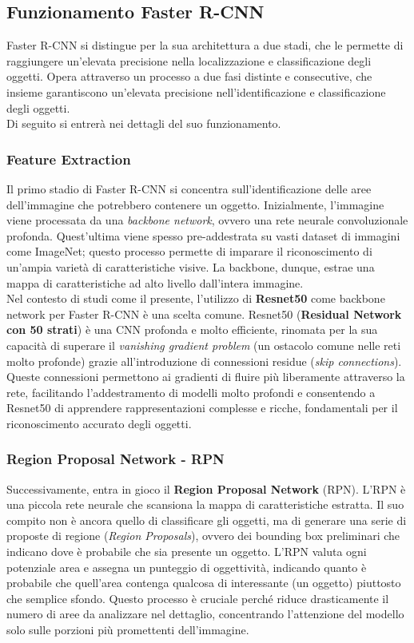 \documentclass[12pt]{article}
\begin{document}
\subsection{Funzionamento Faster R-CNN}
Faster R-CNN si distingue per la sua architettura a due stadi, che le permette di raggiungere un'elevata precisione nella localizzazione e classificazione degli oggetti. Opera attraverso un processo a due fasi distinte e consecutive, che insieme garantiscono un'elevata precisione nell'identificazione e classificazione degli oggetti. \\
Di seguito si entrerà nei dettagli del suo funzionamento.

\subsubsection{Feature Extraction}
Il primo stadio di Faster R-CNN si concentra sull'identificazione delle aree dell'immagine che potrebbero contenere un oggetto. Inizialmente, l'immagine viene processata da una \textit{backbone network}, ovvero una rete neurale convoluzionale profonda. Quest'ultima viene spesso pre-addestrata su vasti dataset di immagini come ImageNet; questo processo permette di imparare il riconoscimento di un'ampia varietà di caratteristiche visive. La backbone, dunque, estrae una mappa di caratteristiche ad alto livello dall'intera immagine. \\
Nel contesto di studi come il presente, l'utilizzo di \textbf{Resnet50} come backbone network per Faster R-CNN è una scelta comune. Resnet50 (\textbf{Residual Network con 50 strati}) è una CNN profonda e molto efficiente, rinomata per la sua capacità di superare il \textit{vanishing gradient problem} (un ostacolo comune nelle reti molto profonde) grazie all'introduzione di connessioni residue (\textit{skip connections}). Queste connessioni permettono ai gradienti di fluire più liberamente attraverso la rete, facilitando l'addestramento di modelli molto profondi e consentendo a Resnet50 di apprendere rappresentazioni complesse e ricche, fondamentali per il riconoscimento accurato degli oggetti.

\subsubsection{Region Proposal Network - RPN}
Successivamente, entra in gioco il \textbf{Region Proposal Network} (RPN). L'RPN è una piccola rete neurale che scansiona la mappa di caratteristiche estratta. Il suo compito non è ancora quello di classificare gli oggetti, ma di generare una serie di proposte di regione (\textit{Region Proposals}), ovvero dei bounding box preliminari che indicano dove è probabile che sia presente un oggetto. L'RPN valuta ogni potenziale area e assegna un punteggio di oggettività, indicando quanto è probabile che quell'area contenga qualcosa di interessante (un oggetto) piuttosto che semplice sfondo. Questo processo è cruciale perché riduce drasticamente il numero di aree da analizzare nel dettaglio, concentrando l'attenzione del modello solo sulle porzioni più promettenti dell'immagine.
\end{document}

